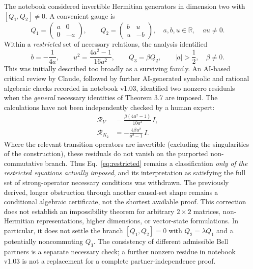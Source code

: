 \documentclass[11pt,a4paper]{article}
\begin{document}
The notebook considered invertible Hermitian generators in dimension two with $[Q_1,Q_2]\ne0$. A convenient gauge is
\begin{equation}
 Q_1=\begin{pmatrix}a&0\\0&-a\end{pmatrix},\qquad
 Q_2=\begin{pmatrix}b&u\\u&-b\end{pmatrix},\quad a,b,u\in\mathbb R,\quad au\ne0.
\end{equation}
Within a \emph{restricted} set of necessary relations, the analysis identified
\begin{equation}
 b=-\frac{1}{4a},\qquad u^2=\frac{4a^2-1}{16a^2},\qquad Q_3=\beta Q_2,
 \qquad |a|>\frac12,\quad \beta\ne0.
\label{eq:restricted}
\end{equation}
This was initially described too broadly as a surviving family. An AI-based critical review by Claude, followed by further AI-generated symbolic and rational algebraic checks recorded in notebook v1.03, identified two nonzero residuals when the \emph{general} necessary identities of Theorem 3.7 are imposed. The calculations have not been independently checked by a human expert:
\begin{align}
\mathcal R_V&=\frac{\beta(4a^2-1)}{10a^4}\,I,\\
\mathcal R_{K_2}&=-\frac{4\beta u^2}{a^2-1}\,I.
\label{eq:generalres}
\end{align}
Where the relevant transition operators are invertible (excluding the singularities of the construction), these residuals do not vanish on the purported non-commutative branch. Thus Eq.~\eqref{eq:restricted} remains a classification \emph{only of the restricted equations actually imposed}, and its interpretation as satisfying the full set of strong-operator necessary conditions was withdrawn. The previously derived, longer obstruction through another causal-set shape remains a conditional algebraic certificate, not the shortest available proof. This correction does not establish an impossibility theorem for arbitrary $2\times2$ matrices, non-Hermitian representations, higher dimensions, or vector-state formulations. In particular, it does not settle the branch $[Q_1,Q_2]=0$ with $Q_2=\lambda Q_1$ and a potentially noncommuting $Q_3$. The consistency of different admissible Bell partners is a separate necessary check; a further nonzero residue in notebook v1.03 is not a replacement for a complete partner-independence proof.
\end{document}
